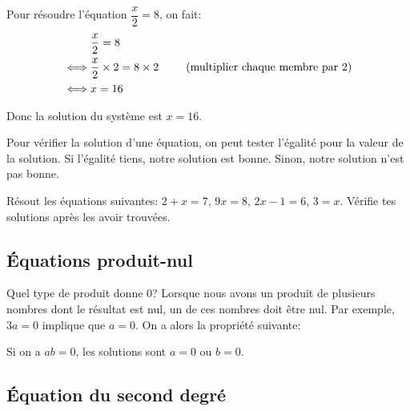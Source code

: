 \begin{exemple}
    Pour résoudre l'équation $\dfrac{x}{2} = 8$, on fait:
    \begin{alignat*}{3}
        & \dfrac{x}{2} = 8&\\
        \iff & \dfrac{x}{2} \times 2 = 8 \times 2& \hspace{5mm} \text{(multiplier chaque membre par 2)}\\
        \iff & x = 16&
    \end{alignat*}

    Donc la solution du système est $x = 16$.
\end{exemple}

\begin{astuce}
    Pour vérifier la solution d'une équation, on peut tester l'égalité pour la valeur de la solution. Si l'égalité tiens, notre solution est bonne. Sinon, notre solution n'est pas bonne.
\end{astuce}

\begin{exercice}
    Résout les équations suivantes: $2 + x = 7$, $9x = 8$, $2x - 1 = 6$, $3 = x$. Vérifie tes solutions après les avoir trouvées.
\end{exercice}


\subsection{Équations produit-nul}

Quel type de produit donne 0? Lorsque nous avons un produit de plusieurs nombres dont le résultat est nul, un de ces nombres doit être nul. Par exemple, $3a = 0$ implique que $a=0$. On a alors la propriété suivante:

\begin{propriete}
    Si on a $ab = 0$, les solutions sont $a = 0$ ou $b = 0$.
\end{propriete}

\subsection{Équation du second degré}